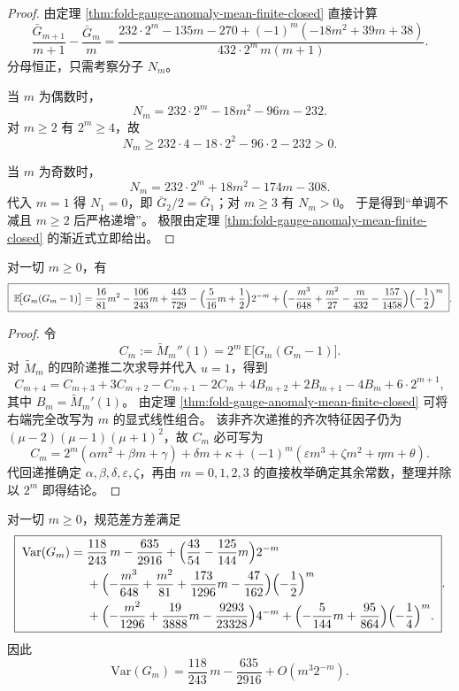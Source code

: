 \begin{proof}
由定理 \ref{thm:fold-gauge-anomaly-mean-finite-closed} 直接计算
\[
\frac{\bar G_{m+1}}{m+1}-\frac{\bar G_m}{m}
=
\frac{
232\cdot 2^m-135m-270+(-1)^m(-18m^2+39m+38)
}{
432\cdot 2^m\,m(m+1)
}.
\]
分母恒正，只需考察分子 \(N_m\)。

当 \(m\) 为偶数时，
\[
N_m=232\cdot 2^m-18m^2-96m-232.
\]
对 \(m\ge 2\) 有 \(2^m\ge 4\)，故
\[
N_m\ge 232\cdot 4-18\cdot 2^2-96\cdot 2-232>0.
\]

当 \(m\) 为奇数时，
\[
N_m=232\cdot 2^m+18m^2-174m-308.
\]
代入 \(m=1\) 得 \(N_1=0\)，即 \(\bar G_2/2=\bar G_1\)；对 \(m\ge 3\) 有 \(N_m>0\)。
于是得到“单调不减且 \(m\ge 2\) 后严格递增”。
极限由定理 \ref{thm:fold-gauge-anomaly-mean-finite-closed} 的渐近式立即给出。
\end{proof}

\begin{theorem}[二阶阶乘矩的精确闭式]\label{thm:fold-gauge-anomaly-second-factorial-finite-closed}
对一切 \(m\ge 0\)，有
\[
\boxed{\;
\mathbb E\!\bigl[G_m(G_m-1)\bigr]
=\frac{16}{81}m^2-\frac{106}{243}m+\frac{443}{729}
-\Bigl(\frac{5}{16}m+\frac12\Bigr)2^{-m}
+\Bigl(-\frac{m^3}{648}+\frac{m^2}{27}-\frac{m}{432}-\frac{157}{1458}\Bigr)\Bigl(-\frac12\Bigr)^m
\; }.
\]
\end{theorem}

\begin{proof}
令
\[
C_m:=\widetilde M_m''(1)=2^m\,\mathbb E\!\bigl[G_m(G_m-1)\bigr].
\]
对 \(\widetilde M_m\) 的四阶递推二次求导并代入 \(u=1\)，得到
\[
C_{m+4}=C_{m+3}+3C_{m+2}-C_{m+1}-2C_m
+4B_{m+2}+2B_{m+1}-4B_m+6\cdot 2^{m+1},
\]
其中 \(B_m=\widetilde M_m'(1)\)。
由定理 \ref{thm:fold-gauge-anomaly-mean-finite-closed} 可将右端完全改写为 \(m\) 的显式线性组合。
该非齐次递推的齐次特征因子仍为 \((\mu-2)(\mu-1)(\mu+1)^2\)，故 \(C_m\) 必可写为
\[
C_m
=2^m(\alpha m^2+\beta m+\gamma)
+\delta m+\kappa
+(-1)^m(\varepsilon m^3+\zeta m^2+\eta m+\theta).
\]
代回递推确定 \(\alpha,\beta,\delta,\varepsilon,\zeta\)，再由 \(m=0,1,2,3\) 的直接枚举确定其余常数，整理并除以 \(2^m\) 即得结论。
\end{proof}

\begin{theorem}[方差的精确有限长度闭式]\label{thm:fold-gauge-anomaly-variance-finite-window-closed}
对一切 \(m\ge 0\)，规范差方差满足
\[
\boxed{\;
\begin{aligned}
\mathrm{Var}(G_m)
={}&\frac{118}{243}\,m-\frac{635}{2916}
+\Bigl(\frac{43}{54}-\frac{125}{144}m\Bigr)2^{-m}\\
&+\Bigl(-\frac{m^3}{648}+\frac{m^2}{81}+\frac{173}{1296}m-\frac{47}{162}\Bigr)\Bigl(-\frac12\Bigr)^m\\
&+\Bigl(-\frac{m^2}{1296}+\frac{19}{3888}m-\frac{9293}{23328}\Bigr)4^{-m}
+\Bigl(-\frac{5}{144}m+\frac{95}{864}\Bigr)\Bigl(-\frac14\Bigr)^m.
\end{aligned}
\; }.
\]
因此
\[
\mathrm{Var}(G_m)=\frac{118}{243}\,m-\frac{635}{2916}+O(m^3 2^{-m}).
\]
\end{theorem}


